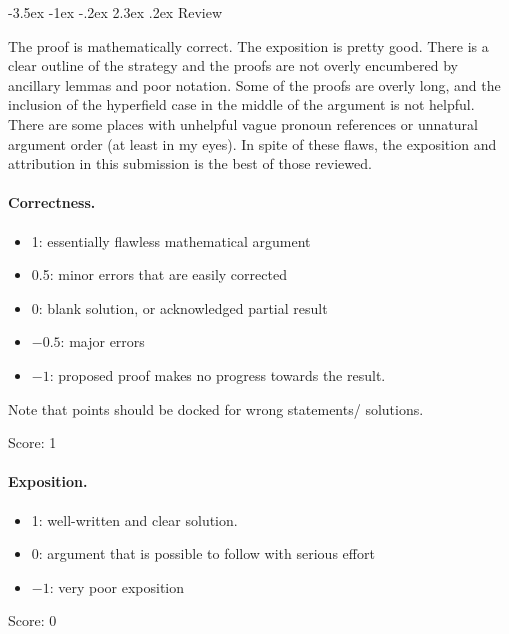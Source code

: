 \documentclass[11pt]{article}
\makeatletter
\renewcommand\section{\@startsection{section}{1}{\z@}
  {-3.5ex \@plus -1ex \@minus -.2ex}
  {2.3ex \@plus.2ex}
  {\normalfont\bfseries}}
\theoremstyle{plain}
\theoremstyle{definition}
\makeatother
\begin{document}
\maketitle

\section{Review}
{\color{gray} 

The proof is mathematically correct. The exposition is pretty good. There is a clear outline of the strategy and the proofs are not overly encumbered by ancillary lemmas and poor notation. Some of the proofs are overly long, and the inclusion of the hyperfield case in the middle of the argument is not helpful. There are some places with unhelpful vague pronoun references or unnatural argument order (at least in my eyes). In spite of these flaws, the exposition and attribution in this submission is the best of those reviewed.}

\paragraph{Correctness.}
\begin{itemize}
	\item  1: essentially flawless mathematical argument
	\item  0.5: minor errors that are easily corrected
	\item  0: blank solution, or acknowledged partial result
	\item  $-0.5$: major errors
	\item  $-1$: proposed proof makes no progress towards the result.
\end{itemize}
Note that points should be docked for wrong statements/ solutions.

\noindent Score: 1

\paragraph{Exposition.}
\begin{itemize}
	\item  1: well-written and clear solution.
	\item  0: argument that is possible to follow with serious effort
	\item  $-1$: very poor exposition
\end{itemize}

\noindent Score: 0
\end{document}
